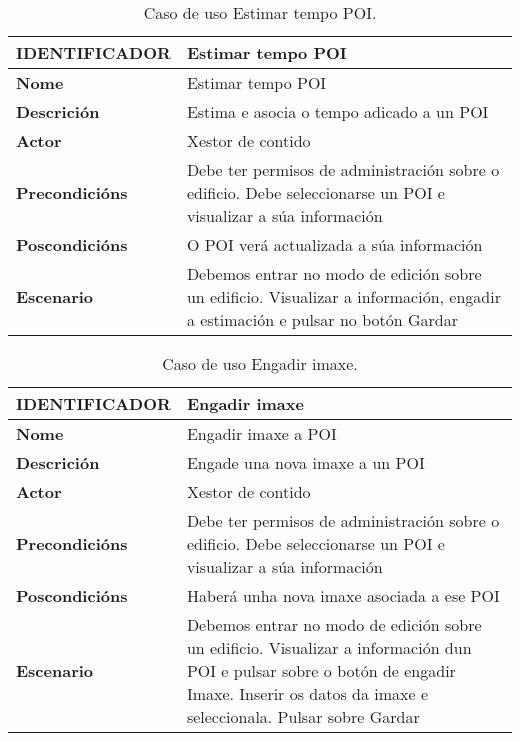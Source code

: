 \begin{table}[tbh]
	\begin{tabular}{|l|p{10cm}|}
		\hline 
		\textbf{IDENTIFICADOR}	& \textbf{Estimar tempo POI} \\ 
		\hline 
		\textbf{Nome} & Estimar tempo POI \\ 
		\hline 
		\textbf{Descrición} & Estima e asocia o tempo adicado a un POI \\ 
		\hline 
		\textbf{Actor} & Xestor de contido \\ 
		\hline 
		\textbf{Precondicións} & Debe ter permisos de administración sobre o edificio. Debe seleccionarse un POI e visualizar a súa información \\ 
		\hline 
		\textbf{Poscondicións} & O POI verá actualizada a súa información \\ 
		\hline 
		\textbf{Escenario} & Debemos entrar no modo de edición sobre un edificio. Visualizar a información, engadir a estimación e pulsar no botón Gardar \\ 
		\hline 
	\end{tabular}
	\caption{Caso de uso Estimar tempo POI.}
	\label{tab:cuEstimarTempoPOI}
\end{table}

\begin{table}[tbh]
	\begin{tabular}{|l|p{10cm}|}
		\hline 
		\textbf{IDENTIFICADOR}	& \textbf{Engadir imaxe} \\ 
		\hline 
		\textbf{Nome} & Engadir imaxe a POI \\ 
		\hline 
		\textbf{Descrición} & Engade una nova imaxe a un POI \\ 
		\hline 
		\textbf{Actor} & Xestor de contido \\ 
		\hline 
		\textbf{Precondicións} & Debe ter permisos de administración sobre o edificio. Debe seleccionarse un POI e visualizar a súa información \\ 
		\hline 
		\textbf{Poscondicións} & Haberá unha nova imaxe asociada a ese POI \\ 
		\hline 
		\textbf{Escenario} & Debemos entrar no modo de edición sobre un edificio. Visualizar a información dun POI e pulsar sobre o botón de engadir Imaxe. Inserir os datos da imaxe e seleccionala. Pulsar sobre Gardar \\ 
		\hline 
	\end{tabular}
	\caption{Caso de uso Engadir imaxe.}
	\label{tab:cuEngadirImaxe}
\end{table}


